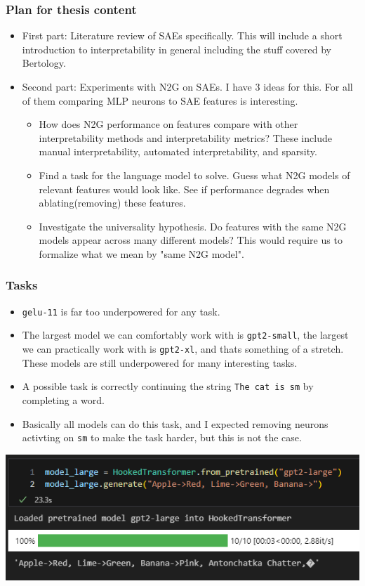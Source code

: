 \documentclass[aspectratio=169]{beamer}
\begin{document}
\begin{frame}[fragile=singleslide]
    \frametitle{Plan for thesis content}
    \begin{itemize}
        \item First part: Literature review of SAEs specifically.
        This will include a short introduction to interpretability in general including the stuff covered by Bertology.
        \item Second part: Experiments with N2G on SAEs.
        I have 3 ideas for this. 
        For all of them comparing MLP neurons to SAE features is interesting.
        \begin{itemize}
            \item How does N2G performance on features compare with other interpretability methods and interpretability metrics?
            These include manual interpretability, automated interpretability, and sparsity.
            \item Find a task for the language model to solve. 
            Guess what N2G models of relevant features would look like.
            See if performance degrades when ablating(removing) these features.
            \item Investigate the universality hypothesis.
            Do features with the same N2G models appear across many different models?
            This would require us to formalize what we mean by "same N2G model".
        \end{itemize}
    \end{itemize}
\end{frame}
\begin{frame}[fragile=singleslide]
    \frametitle{Tasks}
    \begin{itemize}
        \item \verb|gelu-11| is far too underpowered for any task.
        \item The largest model we can comfortably work with is \verb|gpt2-small|, the largest we can practically work with is \verb|gpt2-xl|, and thats something of a stretch.
        These models are still underpowered for many interesting tasks.
        \item A possible task is correctly continuing the string \verb|The cat is sm| by completing a word.
        \item Basically all models can do this task, and I expected removing neurons activting on \verb|sm| to make the task harder, but this is not the case.
    \end{itemize}
    \begin{center}
        \includegraphics[scale=0.6]{images/fruit_colors.png}
    \end{center}
\end{frame}
\end{document}
